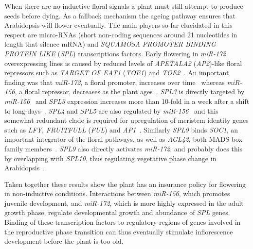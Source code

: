 When there are no inductive floral signals a plant must still attempt to produce seeds before dying.
As a fallback mechanism the ageing pathway ensures that Arabidopsis will flower eventually.
The main players so far elucidated in this respect are micro-RNAs (short non-coding sequences around 21 nucleotides in length that silence mRNA) and \emph{SQUAMOSA PROMOTER BINDING PROTEIN LIKE} (\emph{SPL}) transcriptions factors.
Early flowering in \emph{miR-172} overexpressing lines is caused by reduced levels of \emph{APETALA2} (\emph{AP2})-like floral repressors such as \emph{TARGET OF EAT1} (\emph{TOE1}) and \emph{TOE2}~\cite{aukerman2003}.
An important finding was that \emph{miR-172}, a floral promoter, increases over time~\cite{aukerman2003} whereas \emph{miR-156}, a floral repressor, decreases as the plant ages~\cite{wu2006,wu2009,wang2009}.
\emph{SPL3} is directly targeted by \emph{miR-156}~\cite{wu2006} and \emph{SPL3} expression increases more than 10-fold in a week after a shift to long-days~\cite{schmid2003}.
\emph{SPL4} and \emph{SPL5} are also regulated by \emph{miR-156}~\cite{wu2006} and this somewhat redundant clade is required for upregulation of meristem identity genes such as \emph{LFY}, \emph{FRUITFULL} (\emph{FUL}) and \emph{AP1}~\cite{yamaguchi2009}.
Similarly \emph{SPL9} binds \emph{SOC1}, an important integrator of the floral pathways, as well as \emph{AGL42}, both MADS box family members~\cite{wang2009}.
\emph{SPL9} also directly activates \emph{miR-172}, and probably does this by overlapping with \emph{SPL10}, thus regulating vegetative phase change in Arabidopsis~\cite{wu2009}.

Taken together these results show the plant has an insurance policy for flowering in non-inductive conditions.
Interactions between \emph{miR-156}, which promotes juvenile development, and \emph{miR-172}, which is more highly expressed in the adult growth phase, regulate developmental growth and abundance of \emph{SPL} genes.
Binding of these transcription factors to regulatory regions of genes involved in the reproductive phase transition can thus eventually stimulate inflorescence development before the plant is too old.

